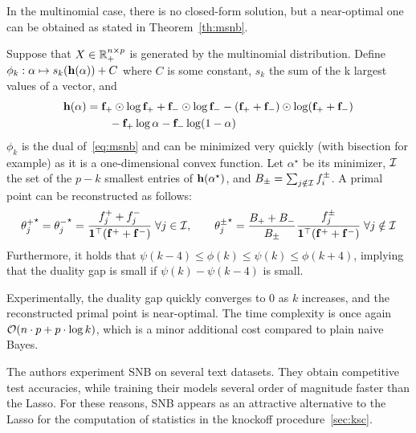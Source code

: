 In the multinomial case, there is no closed-form solution, but a near-optimal one can be obtained as
stated in Theorem~\ref{th:msnb}.
\begin{theorem}\label{th:msnb}
    Suppose that $X \in \mathbb{R}_+^{n \times p}$ is generated by the multinomial distribution.
    Define $\phi_k : \alpha \mapsto s_k(\mathbf{h}(\alpha)) + C$ where $C$ is some constant,
    $s_k$ the sum of the k largest values of a vector, and
    \begin{equation*}
        \begin{split}
            \mathbf{h}(\alpha) &= \mathbf{f}_+ \odot \log \mathbf{f}_+ + \mathbf{f}_- \odot \log \mathbf{f}_-
            - (\mathbf{f}_+ + \mathbf{f}_-) \odot \log (\mathbf{f}_+ + \mathbf{f}_-)\\
            &\qquad - \mathbf{f}_+ \log \alpha - \mathbf{f}_- \log (1 - \alpha)
        \end{split}
    \end{equation*}
    $\phi_k$ is the dual of~\ref{eq:msnb} and can be minimized very quickly (with bisection for example)
    as it is a one-dimensional convex function.
    Let $\alpha^\star$ be its minimizer, $\mathcal{I}$ the set of the $p - k$ smallest entries of
    $\mathbf{h}(\alpha^\star)$, and $B_\pm = \sum_{j \notin \mathcal{I}} f_i^\pm$.
    A primal point can be reconstructed as follows:
    \begin{equation*}
        {\theta^+_j}^\star = {\theta^-_j}^\star = \frac{f_j^+ + f_j^-}{\mathbf{1}^\top(\mathbf{f}^+ + \mathbf{f}^-)}
        \;\forall j \in \mathcal{I}
        ,\qquad
        {\theta^\pm_j}^\star = \frac{B_+ + B_-}{B_\pm}\frac{f^\pm_j}{\mathbf{1}^\top(\mathbf{f}^+ + \mathbf{f}^-)}
        \;\forall j \notin \mathcal{I}
    \end{equation*}
    Furthermore, it holds that $\psi(k - 4) \leq \phi(k) \leq \psi(k) \leq \phi(k + 4)$,
    implying that the duality gap is small if $\psi(k) - \psi(k - 4)$ is small.
\end{theorem}
Experimentally, the duality gap quickly converges to $0$ as $k$ increases,
and the reconstructed primal point is near-optimal.
The time complexity is once again $\mathcal{O}(n \cdot p + p \cdot \log k)$,
which is a minor additional cost compared to plain naive Bayes.

The authors experiment SNB on several text datasets.
They obtain competitive test accuracies,
while training their models several order of magnitude faster than the Lasso.
For these reasons, SNB appears as an attractive alternative to the Lasso for the computation of statistics
in the knockoff procedure~\ref{sec:ksc}.
